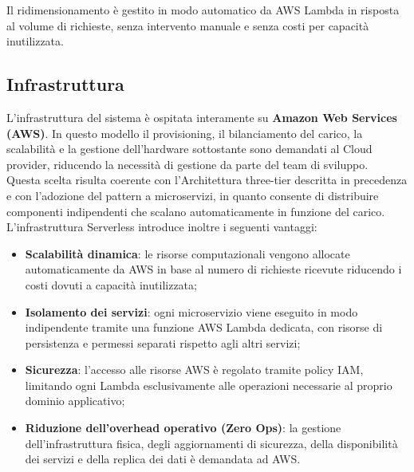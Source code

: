 \documentclass[a4paper,12pt]{article}
\begin{document}
Il ridimensionamento è gestito in modo automatico da AWS Lambda in risposta al volume di richieste, senza intervento manuale e senza costi per capacità inutilizzata.

\subsection{Infrastruttura}
L'infrastruttura del sistema è ospitata interamente su \textbf{Amazon Web Services (AWS)}. 
In questo modello il provisioning, il bilanciamento del carico, la scalabilità e la gestione dell'hardware sottostante sono demandati al Cloud provider, riducendo la necessità di gestione da parte del team di sviluppo.\\

Questa scelta risulta coerente con l'Architettura three-tier descritta in precedenza e con l'adozione del pattern a microservizi, in quanto consente di distribuire componenti indipendenti che scalano automaticamente in funzione del carico. 
L'infrastruttura Serverless introduce inoltre i seguenti vantaggi:
\begin{itemize}
    \item \textbf{Scalabilità dinamica}: le risorse computazionali vengono allocate automaticamente da AWS in base al numero di richieste ricevute riducendo i costi dovuti a capacità inutilizzata;
    \item \textbf{Isolamento dei servizi}: ogni microservizio viene eseguito in modo indipendente tramite una funzione AWS Lambda dedicata, con risorse di persistenza e permessi separati rispetto agli altri servizi;
    \item \textbf{Sicurezza}: l'accesso alle risorse AWS è regolato tramite policy IAM, limitando ogni Lambda esclusivamente alle operazioni necessarie al proprio dominio applicativo;
    \item \textbf{Riduzione dell'overhead operativo (Zero Ops)}: la gestione dell'infrastruttura fisica, degli aggiornamenti di sicurezza, della disponibilità dei servizi e della replica dei dati è demandata ad AWS.
\end{itemize}
\end{document}
